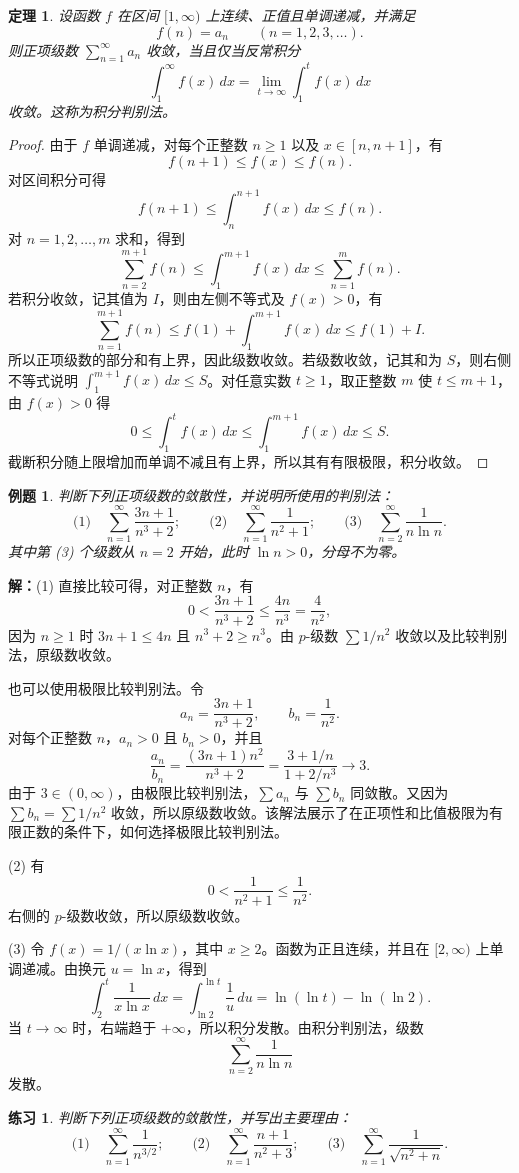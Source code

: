 \documentclass[UTF8,fontset=fandol,11pt]{ctexart}
\newtheorem{theorem}[definition]{定理}
\newtheorem{example}[definition]{例题}
\newtheorem{exercise}[definition]{练习}
\begin{document}
\begin{theorem}
设函数 $f$ 在区间 $[1,\infty)$ 上连续、正值且单调递减，并满足
\[
f(n)=a_n\qquad(n=1,2,3,\ldots).
\]
则正项级数 $\sum_{n=1}^{\infty}a_n$ 收敛，当且仅当反常积分
\[
\int_{1}^{\infty}f(x)\,dx
=\lim_{t\to\infty}\int_{1}^{t}f(x)\,dx
\]
收敛。这称为积分判别法。\label{thm:integral-test}
\end{theorem}
\begin{proof}
由于 $f$ 单调递减，对每个正整数 $n\geq1$ 以及 $x\in[n,n+1]$，有
\[
f(n+1)\leq f(x)\leq f(n).
\]
对区间积分可得
\[
f(n+1)\leq\int_n^{n+1}f(x)\,dx\leq f(n).
\]
对 $n=1,2,\ldots,m$ 求和，得到
\[
\sum_{n=2}^{m+1}f(n)\leq\int_1^{m+1}f(x)\,dx\leq\sum_{n=1}^{m}f(n).
\]
若积分收敛，记其值为 $I$，则由左侧不等式及 $f(x)>0$，有
\[
\sum_{n=1}^{m+1}f(n)\leq f(1)+\int_1^{m+1}f(x)\,dx\leq f(1)+I.
\]
所以正项级数的部分和有上界，因此级数收敛。若级数收敛，记其和为 $S$，则右侧不等式说明 $\int_1^{m+1}f(x)\,dx\leq S$。对任意实数 $t\geq1$，取正整数 $m$ 使 $t\leq m+1$，由 $f(x)>0$ 得
\[
0\leq\int_1^t f(x)\,dx\leq\int_1^{m+1}f(x)\,dx\leq S.
\]
截断积分随上限增加而单调不减且有上界，所以其有有限极限，积分收敛。
\end{proof}
\begin{example}
判断下列正项级数的敛散性，并说明所使用的判别法：
\[
\text{(1)}\quad\sum_{n=1}^{\infty}\frac{3n+1}{n^3+2};
\qquad
\text{(2)}\quad\sum_{n=1}^{\infty}\frac{1}{n^2+1};
\qquad
\text{(3)}\quad\sum_{n=2}^{\infty}\frac{1}{n\ln n}.
\]
其中第 (3) 个级数从 $n=2$ 开始，此时 $\ln n>0$，分母不为零。
\end{example}
\par\noindent\textbf{解：}(1) 直接比较可得，对正整数 $n$，有
\[
0<\frac{3n+1}{n^3+2}\leq\frac{4n}{n^3}=\frac{4}{n^2},
\]
因为 $n\geq1$ 时 $3n+1\leq4n$ 且 $n^3+2\geq n^3$。由 $p$-级数 $\sum 1/n^2$ 收敛以及比较判别法，原级数收敛。

也可以使用极限比较判别法。令
\[
a_n=\frac{3n+1}{n^3+2},\qquad b_n=\frac1{n^2}.
\]
对每个正整数 $n$，$a_n>0$ 且 $b_n>0$，并且
\[
\frac{a_n}{b_n}=\frac{(3n+1)n^2}{n^3+2}
=\frac{3+1/n}{1+2/n^3}\longrightarrow3.
\]
由于 $3\in(0,\infty)$，由极限比较判别法，$\sum a_n$ 与 $\sum b_n$ 同敛散。又因为 $\sum b_n=\sum 1/n^2$ 收敛，所以原级数收敛。该解法展示了在正项性和比值极限为有限正数的条件下，如何选择极限比较判别法。

(2) 有
\[
0<\frac{1}{n^2+1}\leq\frac{1}{n^2}.
\]
右侧的 $p$-级数收敛，所以原级数收敛。

(3) 令 $f(x)=1/(x\ln x)$，其中 $x\geq2$。函数为正且连续，并且在 $[2,\infty)$ 上单调递减。由换元 $u=\ln x$，得到
\[
\int_2^t\frac{1}{x\ln x}\,dx
=\int_{\ln2}^{\ln t}\frac{1}{u}\,du
=\ln(\ln t)-\ln(\ln2).
\]
当 $t\to\infty$ 时，右端趋于 $+\infty$，所以积分发散。由积分判别法，级数
\[
\sum_{n=2}^{\infty}\frac{1}{n\ln n}
\]
发散。\par
\begin{exercise}
\label{mathagent:exercise:0f13776c11d825df9fdf2c3c249691355909a96d5e874285ceb15e0c4116d477}
判断下列正项级数的敛散性，并写出主要理由：
\[
\text{(1)}\quad\sum_{n=1}^{\infty}\frac{1}{n^{3/2}};
\qquad
\text{(2)}\quad\sum_{n=1}^{\infty}\frac{n+1}{n^2+3};
\qquad
\text{(3)}\quad\sum_{n=1}^{\infty}\frac{1}{\sqrt{n^2+n}}.
\]

\end{exercise}
\end{document}
